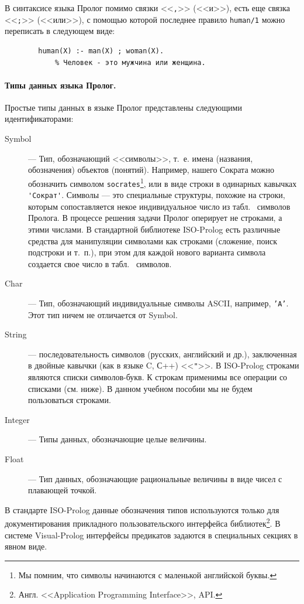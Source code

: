 \documentclass[12pt, openany, twoside]{book} %
\begin{document}
В синтаксисе языка Пролог помимо связки <<{\tt ,}>> (<<и>>), есть еще связка <<{\tt ;}>> (<<или>>), с помощью которой последнее правило {\tt human/1} можно переписать в следующем виде:
{\tt\begin{verbatim}
        human(Х) :- man(Х) ; woman(Х).
            % Человек - это мужчина или женщина.
\end{verbatim}}

\paragraph{Типы данных языка Пролог.} Простые типы данных в языке Пролог представлены следующими идентификаторами:
\begin{description}
\item[Symbol] --- Тип, обозначающий <<символы>>, т.~е. имена (названия, обозначения) объектов (понятий). Например, нашего Сократа можно обозначить символом {\tt socrates}\footnote{Мы помним, что символы начинаются с маленькой английской буквы.}, или в виде строки в одинарных кавычках {\tt \verb|'Сократ'|}. Символы --- это специальные структуры, похожие на строки, которым сопоставляется некое индивидуальное число из табл.~ символов Пролога. В процессе решения задачи Пролог оперирует не строками, а этими числами. В стандартной библиотеке ISO-Prolog есть различные средства для манипуляции символами как строками (сложение, поиск подстроки и т.~п.), при этом для каждой нового варианта символа создается свое число в табл.~ символов.

\item[Char] --- Тип, обозначающий индивидуальные символы ASCII, например, {\tt 'A'}. Этот тип ничем не отличается от Symbol.

\item[String] --- последовательность символов (русских, английский и др.), заключенная в двойные кавычки (как в языке C, С++) <<{\tt \verb|"|}>>. В ISO-Prolog строками являются списки символов-букв. К строкам применимы все операции со списками (см. ниже). В данном учебном пособии мы не будем пользоваться строками.

\item[Integer] --- Типы данных, обозначающие целые величины.
\item[Float] --- Тип данных, обозначающие рациональные величины в виде чисел с плавающей точкой.
\end{description}
В стандарте ISO-Prolog данные обозначения типов используются только для документирования прикладного пользовательского интерфейса библиотек\footnote{Англ. <<Application Programming Interface>>, API.}. В системе Visual-Prolog интерфейсы предикатов задаются в специальных секциях в явном виде.
\end{document}
